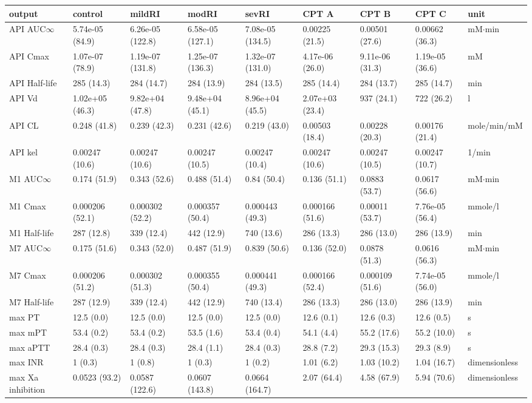 \begin{tabular}{lllllllll}
\toprule
output & control & mildRI & modRI & sevRI & CPT A & CPT B & CPT C & unit \\
\midrule
API AUC$\infty$ & 5.74e-05 (84.9) & 6.26e-05 (122.8) & 6.58e-05 (127.1) & 7.08e-05 (134.5) & 0.00225 (21.5) & 0.00501 (27.6) & 0.00662 (36.3) & mM$\cdot$min \\
API Cmax & 1.07e-07 (78.9) & 1.19e-07 (131.8) & 1.25e-07 (136.3) & 1.32e-07 (131.0) & 4.17e-06 (26.0) & 9.11e-06 (31.3) & 1.19e-05 (36.6) & mM \\
API Half-life & 285 (14.3) & 284 (14.7) & 284 (13.9) & 284 (13.5) & 285 (14.4) & 284 (13.7) & 285 (14.7) & min \\
API Vd & 1.02e+05 (46.3) & 9.82e+04 (47.8) & 9.48e+04 (45.1) & 8.96e+04 (45.5) & 2.07e+03 (23.4) & 937 (24.1) & 722 (26.2) & l \\
API CL & 0.248 (41.8) & 0.239 (42.3) & 0.231 (42.6) & 0.219 (43.0) & 0.00503 (18.4) & 0.00228 (20.3) & 0.00176 (21.4) & mole/min/mM \\
API kel & 0.00247 (10.6) & 0.00247 (10.6) & 0.00247 (10.5) & 0.00247 (10.4) & 0.00247 (10.6) & 0.00247 (10.5) & 0.00247 (10.7) & 1/min \\
M1 AUC$\infty$ & 0.174 (51.9) & 0.343 (52.6) & 0.488 (51.4) & 0.84 (50.4) & 0.136 (51.1) & 0.0883 (53.7) & 0.0617 (56.6) & mM$\cdot$min \\
M1 Cmax & 0.000206 (52.1) & 0.000302 (52.2) & 0.000357 (50.4) & 0.000443 (49.3) & 0.000166 (51.6) & 0.00011 (53.7) & 7.76e-05 (56.4) & mmole/l \\
M1 Half-life & 287 (12.8) & 339 (12.4) & 442 (12.9) & 740 (13.6) & 286 (13.3) & 286 (13.0) & 286 (13.9) & min \\
M7 AUC$\infty$ & 0.175 (51.6) & 0.343 (52.0) & 0.487 (51.9) & 0.839 (50.6) & 0.136 (52.0) & 0.0878 (51.3) & 0.0616 (56.3) & mM$\cdot$min \\
M7 Cmax & 0.000206 (51.2) & 0.000302 (51.3) & 0.000355 (50.4) & 0.000441 (49.3) & 0.000166 (52.4) & 0.000109 (51.6) & 7.74e-05 (56.0) & mmole/l \\
M7 Half-life & 287 (12.9) & 339 (12.4) & 442 (12.9) & 740 (13.4) & 286 (13.3) & 286 (13.0) & 286 (13.9) & min \\
max PT & 12.5 (0.0) & 12.5 (0.0) & 12.5 (0.0) & 12.5 (0.0) & 12.6 (0.1) & 12.6 (0.3) & 12.6 (0.5) & s \\
max mPT & 53.4 (0.2) & 53.4 (0.2) & 53.5 (1.6) & 53.4 (0.4) & 54.1 (4.4) & 55.2 (17.6) & 55.2 (10.0) & s \\
max aPTT & 28.4 (0.3) & 28.4 (0.3) & 28.4 (1.1) & 28.4 (0.3) & 28.8 (7.2) & 29.3 (15.3) & 29.3 (8.9) & s \\
max INR & 1 (0.3) & 1 (0.8) & 1 (0.3) & 1 (0.2) & 1.01 (6.2) & 1.03 (10.2) & 1.04 (16.7) & dimensionless \\
max Xa inhibition & 0.0523 (93.2) & 0.0587 (122.6) & 0.0607 (143.8) & 0.0664 (164.7) & 2.07 (64.4) & 4.58 (67.9) & 5.94 (70.6) & dimensionless \\
\bottomrule
\end{tabular}
